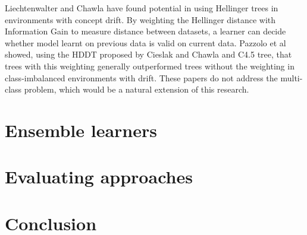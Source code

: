 \documentclass[10pt]{article}
\begin{document}
Liechtenwalter and Chawla \cite{lic10} have found potential in using Hellinger trees in environments with concept drift. By weighting the Hellinger distance with Information Gain to measure distance between datasets, a learner can decide whether model learnt on previous data is valid on current data. Pazzolo et al \cite{paz14} showed, using the HDDT proposed by Cieslak and Chawla \cite{cie08} and C4.5 tree, that trees with this weighting generally outperformed trees without the weighting in class-imbalanced environments with drift. These papers do not address the multi-class problem, which would be a natural extension of this research.

\section{Ensemble learners}
\section{Evaluating approaches}


\section{Conclusion}

\newpage


\end{document}
